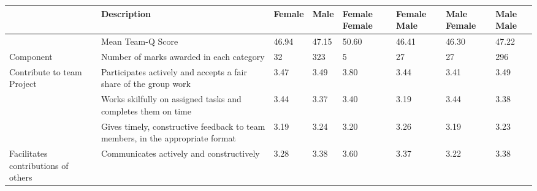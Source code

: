\documentclass[sigconf, anonymous=true]{acmart}
\begin{document}
\begin{table*}[ht]
\begin{tabular} {| p{2cm} | p{7cm} | p{1cm}| p{1cm} | p{1cm}| p{1cm} |p{1cm} |p{1cm} |}
		&Description&Female&Male&Female Female&Female Male&Male Female&Male Male\\
		\hline
		& Mean Team-Q Score                                                                                                              & 
		46.94 &
		47.15 &
		50.60                                                    & 46.41                                                & 46.30                                                & 47.22                                              \\
		\hline
		Component& Number of marks awarded in each category                                                                                                              & 32 & 323 & 5                                                       & 27                                                    & 27                                                    & 296
		\\
		\hline
			Contribute to team Project          & Participates actively and accepts a fair share of the group work                                 &
		 3.47 &
		 3.49 &
		 3.80                                                     & 3.44                                                 & 3.41                                                 & 3.49                                               \\
		\hline
		& Works skilfully on assigned tasks and completes them on time                                     &
		 3.44 &
		 3.37 &		 
		 3.40                                                     & 3.19                                                 & 3.44                                                 & 3.38                                               \\
		\hline
		& Gives timely, constructive feedback to team members, in the appropriate format                   &
		 3.19 &
		 3.24 &
		 3.20                                                     & 3.26                                                 & 3.19                                                 & 3.23                                               \\
		\hline
		Facilitates contributions of others & Communicates actively and constructively                                                         &
		 3.28 &
		 3.38 &
		 3.60                                                     & 3.37                                                 & 3.22                                                 & 3.38                                               \\

\end{tabular}
\end{table*}
\end{document}

